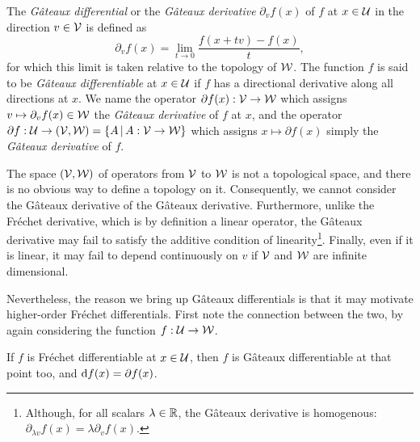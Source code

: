 \begin{definition}
  The \emph{Gâteaux differential} or the \emph{Gâteaux derivative} $\partial_v f(x)$ of $f$ at $x \in {\mathcal U}$ in the direction $v\in{\mathcal V}$ is defined as
  \[
    \partial_v f(x) = \lim_{t \to 0} \frac{f(x + t v) - f(x)}{t},  %
  \]  
  for which this limit is taken relative to the topology of ${\mathcal W}$.
  The function $f$ is said to be \emph{Gâteaux differentiable} at $x\in{\mathcal U}$ if $f$ has a directional derivative along all directions at $x$.
  We name the operator $\partial f(x):{\mathcal V}\to{\mathcal W}$ which assigns $v \mapsto \partial_v f(x) \in {\mathcal W}$ the \emph{Gâteaux derivative} of $f$ at $x$, and the operator $\partial f:{\mathcal U}\to({\mathcal V},{\mathcal W}) = \{A \,|\, A:{\mathcal V}\to{\mathcal W} \}$ which assigns $x \mapsto \partial f(x)$ simply the \emph{Gâteaux derivative} of $f$.
  
\end{definition}

\begin{remark}
  The space $({\mathcal V},{\mathcal W})$ of operators from ${\mathcal V}$ to ${\mathcal W}$ is not a topological space, and there is no obvious way to define a topology on it.
  Consequently, we cannot consider the Gâteaux derivative of the Gâteaux derivative.
  Furthermore, unlike the Fréchet derivative, which is by definition a linear operator, the Gâteaux derivative may fail to satisfy the additive condition of linearity\footnote{Although, for all scalars $\lambda \in \mathbb{R}$, the Gâteaux derivative is homogenous: $\partial_{\lambda v}f(x) = \lambda \partial_v f(x)$.}.
  Finally, even if it is linear, it may fail to depend continuously on $v$ if ${\mathcal V}$ and ${\mathcal W}$ are infinite dimensional.
\end{remark}

Nevertheless, the reason we bring up Gâteaux differentials is that it may motivate higher-order Fréchet differentials.
First note the connection between the two, by again considering the function $f:{\mathcal U}\to{\mathcal W}$.

\begin{lemma}
  If $f$ is Fréchet differentiable at $x\in{\mathcal U}$, then $f$ is Gâteaux differentiable at that point too, and $\text{d} f(x) = \partial f(x)$.
\end{lemma}


